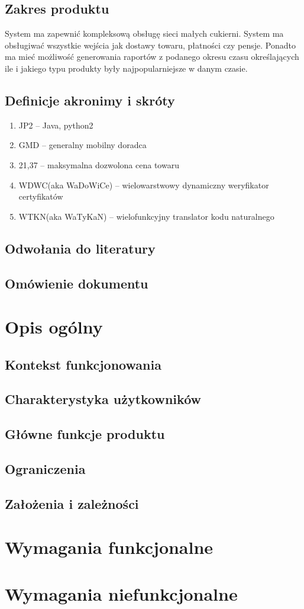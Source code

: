 \documentclass[16pt,a4paper]{article}
\begin{document}
\subsection{Zakres produktu}
System ma zapewnić kompleksową obsługę sieci małych cukierni. System ma obsługiwać wszystkie wejścia jak dostawy towaru, płatności czy pensje. Ponadto ma mieć możliwość generowania raportów z podanego okresu czasu określających ile i jakiego typu produkty były najpopularniejsze w danym czasie.      
\subsection{Definicje akronimy i skróty}
\begin{enumerate}
\item JP2 -- Java, python2
\item GMD -- generalny mobilny doradca
\item 21,37 -- maksymalna dozwolona cena towaru 
\item WDWC(aka WaDoWiCe) -- wielowarstwowy dynamiczny weryfikator certyfikatów 
\item WTKN(aka WaTyKaN)  -- wielofunkcyjny translator kodu naturalnego
\end{enumerate}


   
\subsection{Odwołania do literatury}
\subsection{Omówienie dokumentu}
\section{Opis ogólny}
\subsection{Kontekst funkcjonowania}
\subsection{Charakterystyka użytkowników}
\subsection{Główne funkcje produktu}
\subsection{Ograniczenia}
\subsection{Założenia i zależności}
\section{Wymagania funkcjonalne}
\section{Wymagania niefunkcjonalne}
\end{document}
